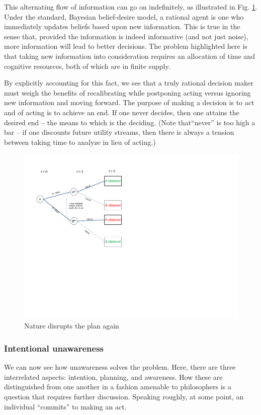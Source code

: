 \documentclass[
11pt,
titlepage,
reqno,
]{article}%
\theoremstyle{definition}
\begin{document}
This alternating flow of information can go on indefinitely, as illustrated in Fig. \ref{Diag: p-10}. Under the standard, Bayesian belief-desire model, a rational agent is one who immediately updates beliefs based upon new information. This is true in the sense that, provided the information is indeed informative (and not just noise), more information will lead to better decisions. The problem highlighted here is that taking new information into consideration requires an allocation of time and cognitive resources, both of which are in finite supply. 

By explicitly accounting for this fact, we see that a truly rational decision maker must weigh the benefits of recalibrating while postponing acting versus ignoring new information and moving forward. The purpose of making a decision is to act and of acting is to achieve an end. If one never decides, then one attains the desired end -- the means to which is the deciding. (Note that``never'' is too high a bar -- if one discounts future utility streams, then there is always a tension between taking time to analyze in lieu of acting.)

\begin{figure}[h!]
	\centering
	\includegraphics*[page=10,trim = 0 3.5in 0in 0in,scale=.65]{Awareness_Diagrams_All}
	\caption{Nature disrupts the plan again\label{Diag: p-10}}%
\end{figure}

\subsubsection{Intentional unawareness}
We can now see how unawareness solves the problem. Here, there are three interrelated aspects: intention, planning, and awareness. How these are distinguished from one another in  a fashion amenable to philosophers is a question that requires further discussion. Speaking roughly, at some point, an individual ``commits'' to making an act.
\end{document}
